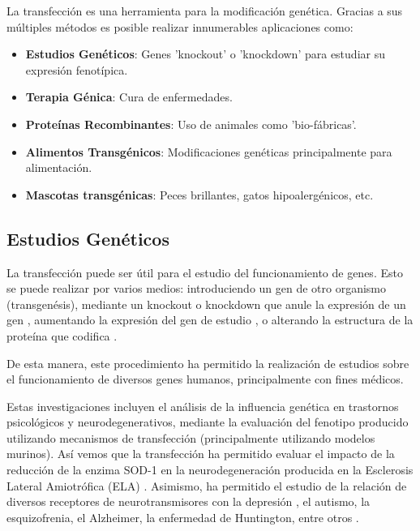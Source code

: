 \documentclass[fleqn,10pt]{SelfArx} %
\begin{document}
La transfección es una herramienta para la modificación genética. Gracias a sus múltiples métodos es posible realizar innumerables aplicaciones como:
\begin{itemize}[noitemsep] %
\item \textbf{Estudios Genéticos}: Genes 'knockout' o 'knockdown' para estudiar su expresión fenotípica.
\item \textbf{Terapia Génica}: Cura de enfermedades.
\item \textbf{Proteínas Recombinantes}: Uso de animales como 'bio-fábricas'.
\item \textbf{Alimentos Transgénicos}: Modificaciones genéticas principalmente para alimentación.
\item \textbf{Mascotas transgénicas}: Peces brillantes, gatos hipoalergénicos, etc.
\end{itemize}

\subsection{Estudios Genéticos}

La transfección puede ser útil para el estudio del funcionamiento de genes. Esto se puede realizar por varios medios: introduciendo un gen de otro organismo (transgenésis), mediante un knockout o knockdown que anule la expresión de un gen \cite{cryanin2004}, aumentando la expresión del gen de estudio \cite{yanni2004laboratory}, o alterando la estructura de la proteína que codifica \cite{ripps1995transgenic}.

De esta manera, este procedimiento ha permitido la realización de estudios sobre el funcionamiento de diversos genes humanos, principalmente con fines médicos.

Estas investigaciones incluyen el análisis de la influencia genética en trastornos psicológicos y neurodegenerativos, mediante la evaluación del fenotipo producido utilizando mecanismos de transfección (principalmente utilizando modelos murinos). Así vemos que la transfección ha permitido evaluar el impacto de la reducción de la enzima SOD-1 en la neurodegeneración producida en la Esclerosis Lateral Amiotrófica (ELA) \cite{ripps1995transgenic}. Asimismo, ha permitido el estudio de la relación de diversos receptores de neurotransmisores con la depresión \cite{cryanin2004}, el autismo, la esquizofrenia, el Alzheimer, la enfermedad de Huntington, entre otros \cite{anthe2002}.
\end{document}
